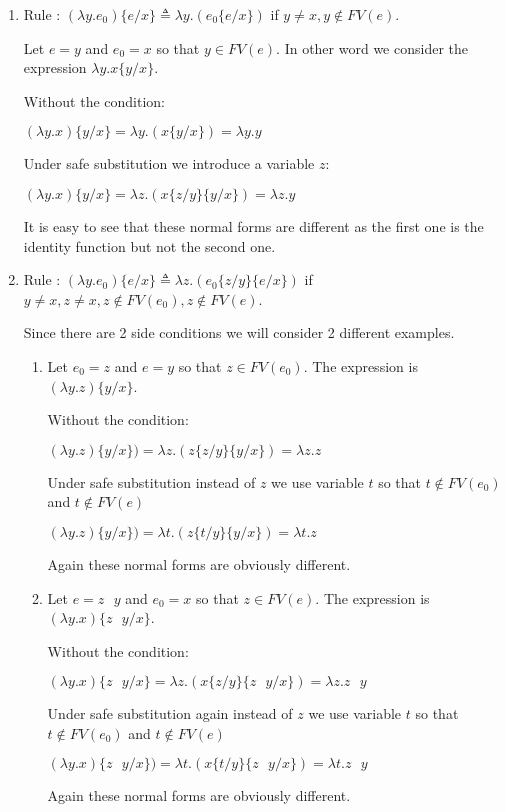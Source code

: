 \documentclass[10pt]{article}
\begin{document}
\begin{enumerate}
\item Rule : $(\lambda y . e_0) \{ e / x\} \triangleq \lambda y . (e_0 \{ e / x \})$ if $y \neq x, y \notin FV(e)$.

Let $e = y$ and $e_0 = x$ so that $y \in FV(e)$. In other word we consider the expression $\lambda y. x \{ y / x\}$.

Without the condition:

$(\lambda y. x )\{ y / x\} = \lambda y . (x \{ y / x \}) = \lambda y. y$

Under safe substitution we introduce a variable $z$:

$(\lambda y. x) \{ y / x\} = \lambda z . (x \{z / y\} \{y / x\}) = \lambda z . y$

It is easy to see that these normal forms are different as the first one is the identity function but not the second one.
\item Rule : $(\lambda y . e_0) \{ e / x\} \triangleq \lambda z . (e_0 \{z / y\}\{ e / x \})$ if $y \neq x, z \neq x, z \notin FV(e_0), z \notin FV(e)$.

Since there are 2 side conditions we will consider 2 different examples.
\begin{enumerate}
\item Let $e_0 = z$ and $e = y$ so that $z \in FV(e_0)$. The expression is $(\lambda y . z) \{ y / x \}$. 

Without the condition:

$(\lambda y. z) \{ y / x\}) = \lambda z . (z \{z / y\} \{ y / x \}) = \lambda z. z$

Under safe substitution instead of $z$ we use variable $t$ so that $t \notin FV(e_0)$ and $t \notin FV(e)$

$(\lambda y. z) \{ y / x\}) = \lambda t . (z \{t / y\} \{y / x\}) = \lambda t . z$

Again these normal forms are obviously different.
\item Let $e = z \text{ } y$ and $e_0 = x$ so that $z \in FV(e)$. The expression is $(\lambda y . x) \{ z \text{ } y / x \}$. 

Without the condition:

$(\lambda y . x) \{ z \text{ } y / x \}= \lambda z . (x \{z / y\} \{z \text{ } y / x \}) = \lambda z. z \text{ } y$

Under safe substitution again instead of $z$ we use variable $t$ so that $t \notin FV(e_0)$ and $t \notin FV(e)$

$(\lambda y.  x) \{ z \text{ } y / x\}) = \lambda t . (x \{t / y\} \{z \text{ } y / x\}) = \lambda t . z \text{ } y$

Again these normal forms are obviously different.
\end{enumerate}
\end{enumerate}
\end{document}
